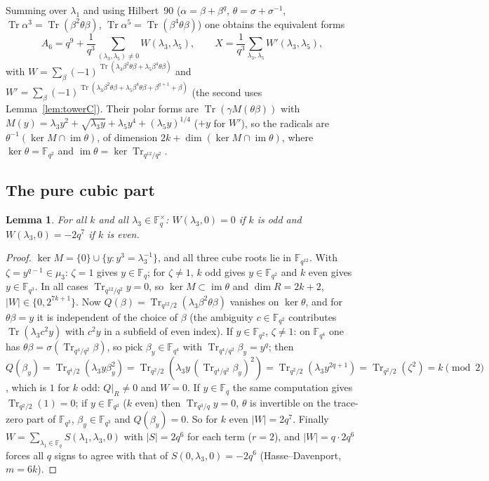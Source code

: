 \documentclass[11pt,a4paper]{amsart}
\newtheorem{lemma}[theorem]{Lemma}
\theoremstyle{definition}
\newcommand{\F}{\mathbb{F}}
\newcommand{\Tr}{\operatorname{Tr}}
\newcommand{\im}{\operatorname{im}}
\begin{document}
Summing over $\lambda_1$ and using Hilbert~90 ($\alpha=\beta+\beta^q$, $\theta=\sigma+\sigma^{-1}$, $\Tr\alpha^3=\Tr(\beta^2\theta\beta)$, $\Tr\alpha^5=\Tr(\beta^4\theta\beta)$) one obtains the equivalent forms
\begin{equation}\label{eq:W}
A_6=q^9+\frac1{q^3}\sum_{(\lambda_3,\lambda_5)\ne0}W(\lambda_3,\lambda_5),\qquad
X=\frac1{q^3}\sum_{\lambda_3,\lambda_5}W'(\lambda_3,\lambda_5),
\end{equation}
with $W=\sum_\beta(-1)^{\Tr(\lambda_3\beta^2\theta\beta+\lambda_5\beta^4\theta\beta)}$ and $W'=\sum_\beta(-1)^{\Tr(\lambda_3\beta^2\theta\beta+\lambda_5\beta^4\theta\beta+\beta^{q+1}+\beta)}$ (the second uses Lemma~\ref{lem:towerC}). Their polar forms are $\Tr(\gamma M(\theta\beta))$ with $M(y)=\lambda_3y^2+\sqrt{\lambda_3y}+\lambda_5y^4+(\lambda_5y)^{1/4}$ ($+y$ for $W'$), so the radicals are $\theta^{-1}(\ker M\cap\im\theta)$, of dimension $2k+\dim(\ker M\cap\im\theta)$, where $\ker\theta=\F_{q^2}$ and $\im\theta=\ker\Tr_{q^{12}/q^2}$.

\subsection{The pure cubic part}
\begin{lemma}\label{lem:purecubic}
For all $k$ and all $\lambda_3\in\F_q^\times$: $W(\lambda_3,0)=0$ if $k$ is odd and $W(\lambda_3,0)=-2q^7$ if $k$ is even.
\end{lemma}
\begin{proof}
$\ker M=\{0\}\cup\{y:y^3=\lambda_3^{-1}\}$, and all three cube roots lie in $\F_{q^{12}}$. With $\zeta=y^{q-1}\in\mu_3$: $\zeta=1$ gives $y\in\F_q$; for $\zeta\ne1$, $k$ odd gives $y\in\F_{q^2}$ and $k$ even gives $y\in\F_{q^3}$. In all cases $\Tr_{q^{12}/q^2}y=0$, so $\ker M\subset\im\theta$ and $\dim R=2k+2$, $|W|\in\{0,2^{7k+1}\}$. Now $Q(\beta)=\Tr_{q^{12}/2}(\lambda_3\beta^2\theta\beta)$ vanishes on $\ker\theta$, and for $\theta\beta=y$ it is independent of the choice of $\beta$ (the ambiguity $c\in\F_{q^2}$ contributes $\Tr(\lambda_3c^2y)$ with $c^2y$ in a subfield of even index). If $y\in\F_{q^2}$, $\zeta\ne1$: on $\F_{q^4}$ one has $\theta\beta=\sigma(\Tr_{q^4/q^2}\beta)$, so pick $\beta_y\in\F_{q^4}$ with $\Tr_{q^4/q^2}\beta_y=y^q$; then
$Q(\beta_y)=\Tr_{q^4/2}(\lambda_3y\beta_y^2)=\Tr_{q^2/2}(\lambda_3y\,(\Tr_{q^4/q^2}\beta_y)^2)=\Tr_{q^2/2}(\lambda_3y^{2q+1})=\Tr_{q^2/2}(\zeta^2)=k\pmod2$, which is $1$ for $k$ odd: $Q|_R\ne0$ and $W=0$. If $y\in\F_q$ the same computation gives $\Tr_{q^2/2}(1)=0$; if $y\in\F_{q^3}$ ($k$ even) then $\Tr_{q^3/q}y=0$, $\theta$ is invertible on the trace-zero part of $\F_{q^3}$, $\beta_y\in\F_{q^3}$ and $Q(\beta_y)=0$. So for $k$ even $|W|=2q^7$. Finally $W=\sum_{\lambda_1\in\F_q}S(\lambda_1,\lambda_3,0)$ with $|S|=2q^6$ for each term ($r=2$), and $|W|=q\cdot2q^6$ forces all $q$ signs to agree with that of $S(0,\lambda_3,0)=-2q^6$ (Hasse--Davenport, $m=6k$).
\end{proof}
\end{document}
